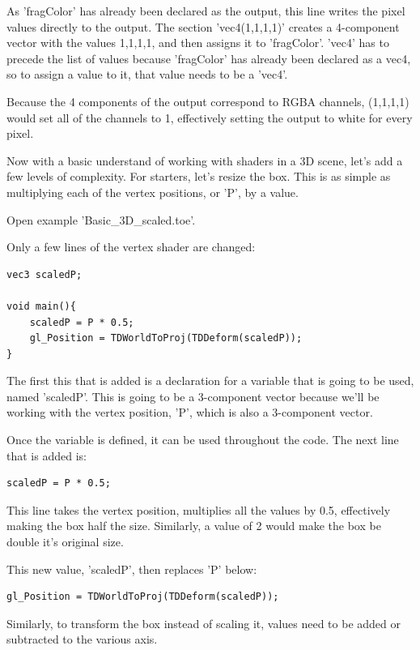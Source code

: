 \begin{fullwidth}
As 'fragColor' has already been declared as the output, this line writes the pixel values directly to the output. The section 'vec4(1,1,1,1)' creates a 4-component vector with the values 1,1,1,1, and then assigns it to 'fragColor'. 'vec4' has to precede the list of values because 'fragColor' has already been declared as a vec4, so to assign a value to it, that value needs to be a 'vec4'. 

Because the 4 components of the output correspond to RGBA channels, (1,1,1,1) would set all of the channels to 1, effectively setting the output to white for every pixel. 

Now with a basic understand of working with shaders in a 3D scene, let's add a few levels of complexity. For starters, let's resize the box. This is as simple as multiplying each of the vertex positions, or 'P', by a value.

Open example 'Basic\_3D\_scaled.toe'. 

Only a few lines of the vertex shader are changed:

\begin{lstlisting}
vec3 scaledP;

void main(){
	scaledP = P * 0.5;
	gl_Position = TDWorldToProj(TDDeform(scaledP));
}
\end{lstlisting}

The first this that is added is a declaration for a variable that is going to be used, named 'scaledP'. This is going to be a 3-component vector because we'll be working with the vertex position, 'P', which is also a 3-component vector. 

Once the variable is defined, it can be used throughout the code. The next line that is added is:

\begin{lstlisting}
scaledP = P * 0.5;
\end{lstlisting}

This line takes the vertex position, multiplies all the values by 0.5, effectively making the box half the size. Similarly, a value of 2 would make the box be double it's original size. 

This new value, 'scaledP', then replaces 'P' below:

\begin{lstlisting}
gl_Position = TDWorldToProj(TDDeform(scaledP));
\end{lstlisting}

Similarly, to transform the box instead of scaling it, values need to be added or subtracted to the various axis. 


\end{fullwidth}
